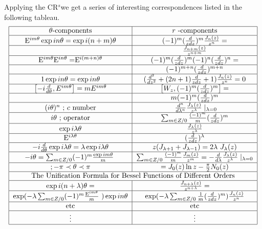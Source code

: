 \documentclass[a4paper,11pt]{article}
\begin{document}
Applying the CR$^{s}$we get a series of interesting correspondences listed
in the following tableau. 
\[
\begin{tabular}{|c|c|}
\hline
$\theta $-components & $r$ -components \\ \hline
E$^{im\theta }\exp in\theta =\exp i(n+m)\theta $ & $(-1)^{m}(\frac{d}{zdz}%
)^{m}\frac{J_{n}(z)}{z^{n}}=$ \\ \hline
& $\frac{J_{n+m}(z)}{z^{n+m}}$ \\ \hline
E$^{im\theta }$E$^{in\theta }=$E$^{i(m+n)\theta }$ & $(-1)^{m}(\frac{d}{zdz}%
)^{m}(-1)^{n}(\frac{d}{zdz})^{n}=$ \\ \hline
& $(-1)^{m+n}(\frac{d}{zdz})^{m+n}$ \\ \hline
$1\exp in\theta =\exp in\theta $ & $(\frac{d^{2}}{dz^{2}}+(2n+1)\frac{d}{zdz}%
+1)\frac{J_{n}(z)}{z^{n}}=0$ \\ \hline
$\left[ -i\frac{d}{d\theta },E^{im\theta }\right] =mE^{im\theta }$ & $\left[
W_{z},(-1)^{m}(\frac{d}{zdz})^{m}\right] =$ \\ \hline
& $m(-1)^{m}(\frac{d}{zdz})^{m}$ \\ \hline
$(i\theta )^{n}$ ; $c$ number & $\ \frac{d^{n}}{d\lambda ^{n}}\frac{%
J_{\lambda }(z)}{z^{\lambda }}\mid _{\lambda =0}$ \\ \hline
$i\theta $ ; operator & $\sum_{m\in Z/0}\frac{(-1)^{m}}{m}(\frac{d}{zdz}%
)^{m} $ \\ \hline
$\exp i\lambda \theta $ & $\frac{J_{\lambda }(z)}{z^{\lambda }}$ \\ \hline
E$^{i\lambda \theta }$ & $(\frac{d}{zdz})^{\lambda }$ \\ \hline
$-i\frac{d}{d\theta }\exp i\lambda \theta =\lambda \exp i\lambda \theta $ & $%
z(J_{\lambda +1}+J_{\lambda -1})=2\lambda $ $J_{\lambda }(z)$ \\ \hline
$-i\theta =\sum_{m\in Z/0}(-1)^{m}\frac{\exp im\theta }{m}\textrm{ }$ & $%
\sum_{m\in Z/0}\frac{(-1)^{m}}{m}\frac{J_{m}(z)}{z^{m}}=-\frac{d}{d\lambda }%
\frac{J_{\lambda }(z)}{z^{\lambda }}\mid _{\lambda =0}$ \\ \hline
$;-\pi \prec \theta \prec \pi $ & $=J_{0}(z)\ln z-\frac{\pi }{2}N_{0}(z)$ \\ 
\hline
\multicolumn{2}{|c|}{The Unification Formula for Bessel Functions of
Different Orders} \\ \hline
$\exp i(n+\lambda )\theta =$ & $\frac{J_{n+\lambda }(z)}{z^{n+\lambda }}=$
\\ \hline
$\exp (-\lambda \sum_{m\in Z/0}(-1)^{m}\frac{\textrm{E}^{im\theta }}{m}\textrm{ }%
)\exp in\theta $ & $\exp (-\lambda \sum_{m\in Z/0}\frac{1}{m}(\frac{d}{zdz}%
)^{m})\frac{J_{n}(z)}{z^{n}}$ \\ \hline
etc & etc \\ \hline
$\vdots $ & $\vdots $ \\ \hline
\end{tabular}%
\]
\end{document}
